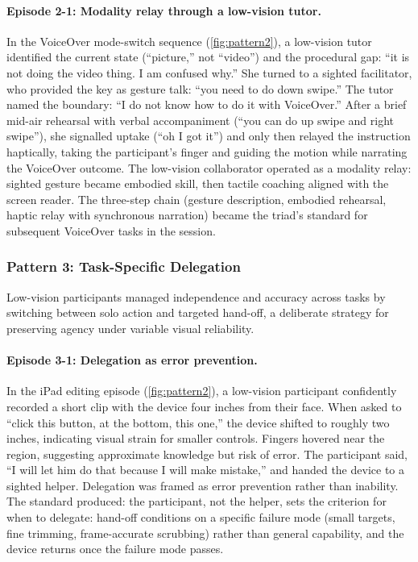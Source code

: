 \paragraph{Episode 2-1: Modality relay through a low-vision tutor.}
In the VoiceOver mode-switch sequence (\autoref{fig:pattern2}), a low-vision tutor identified the current state (``picture,'' not ``video'') and the procedural gap: ``it is not doing the video thing. I am confused why.'' She turned to a sighted facilitator, who provided the key as gesture talk: ``you need to do down swipe.'' The tutor named the boundary: ``I do not know how to do it with VoiceOver.'' After a brief mid-air rehearsal with verbal accompaniment (``you can do up swipe and right swipe''), she signalled uptake (``oh I got it'') and only then relayed the instruction haptically, taking the participant's finger and guiding the motion while narrating the VoiceOver outcome. The low-vision collaborator operated as a modality relay: sighted gesture became embodied skill, then tactile coaching aligned with the screen reader. The three-step chain (gesture description, embodied rehearsal, haptic relay with synchronous narration) became the triad's standard for subsequent VoiceOver tasks in the session.

\subsubsection{Pattern 3: Task-Specific Delegation}

Low-vision participants managed independence and accuracy across tasks by switching between solo action and targeted hand-off, a deliberate strategy for preserving agency under variable visual reliability.

\paragraph{Episode 3-1: Delegation as error prevention.}
In the iPad editing episode (\autoref{fig:pattern2}), a low-vision participant confidently recorded a short clip with the device four inches from their face. When asked to ``click this button, at the bottom, this one,'' the device shifted to roughly two inches, indicating visual strain for smaller controls. Fingers hovered near the region, suggesting approximate knowledge but risk of error. The participant said, ``I will let him do that because I will make mistake,'' and handed the device to a sighted helper. Delegation was framed as error prevention rather than inability. The standard produced: the participant, not the helper, sets the criterion for when to delegate: hand-off conditions on a specific failure mode (small targets, fine trimming, frame-accurate scrubbing) rather than general capability, and the device returns once the failure mode passes.

